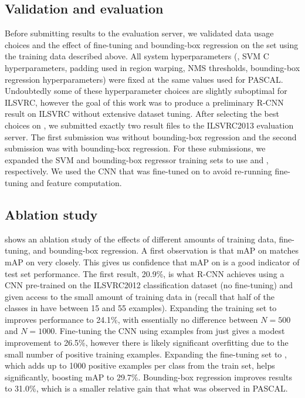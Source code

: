\subsection{Validation and evaluation}
Before submitting results to the evaluation server, we validated data usage choices and the effect of fine-tuning and bounding-box regression on the \valb set using the training data described above.
All system hyperparameters (\eg, SVM C hyperparameters, padding used in region warping, NMS thresholds, bounding-box regression hyperparameters) were fixed at the same values used for PASCAL.
Undoubtedly some of these hyperparameter choices are slightly suboptimal for ILSVRC, however the goal of this work was to produce a preliminary R-CNN result on ILSVRC without extensive dataset tuning.
After selecting the best choices on \valb, we submitted exactly two result files to the ILSVRC2013 evaluation server.
The first submission was without bounding-box regression and the second submission was with bounding-box regression.
For these submissions, we expanded the SVM and bounding-box regressor training sets to use \trainvalab and \val, respectively.
We used the CNN that was fine-tuned on \trainvalb to avoid re-running fine-tuning and feature computation.

\subsection{Ablation study}
 shows an ablation study of the effects of different amounts of training data, fine-tuning, and bounding-box regression.
A first observation is that mAP on \valb matches mAP on \test very closely.
This gives us confidence that mAP on \valb is a good indicator of test set performance.
The first result, 20.9\%, is what R-CNN achieves using a CNN pre-trained on the ILSVRC2012 classification dataset (no fine-tuning) and given access to the small amount of training data in \vala (recall that half of the classes in \vala have between 15 and 55 examples).
Expanding the training set to \trainvalN improves performance to 24.1\%, with essentially no difference between $N = 500$ and $N = 1000$.
Fine-tuning the CNN using examples from just \vala gives a modest improvement to 26.5\%, however there is likely significant overfitting due to the small number of positive training examples.
Expanding the fine-tuning set to \trainvalb, which adds up to 1000 positive examples per class from the train set, helps significantly, boosting mAP to 29.7\%.
Bounding-box regression improves results to 31.0\%, which is a smaller relative gain that what was observed in PASCAL.

